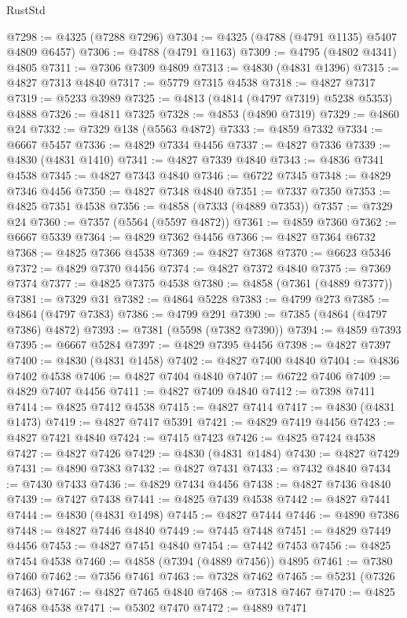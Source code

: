 \begin{lexlean}{RustStd}
\begin{coremodule}
@7298 := @4325 (@7288 @7296)
@7304 := @4325 (@4788 (@4791 @1135) @5407 @4809 @6457)
@7306 := @4788 (@4791 @1163)
@7309 := @4795 (@4802 @4341) @4805
@7311 := @7306 @7309 @4809
@7313 := @4830 (@4831 @1396)
@7315 := @4827 @7313 @4840
@7317 := @5779 @7315 @4538
@7318 := @4827 @7317
@7319 := @5233 @3989
@7325 := @4813 (@4814 (@4797 @7319) @5238 @5353) @4888
@7326 := @4811 @7325
@7328 := @4853 (@4890 @7319)
@7329 := @4860 @24
@7332 := @7329 @138 (@5563 @4872)
@7333 := @4859 @7332
@7334 := @6667 @5457
@7336 := @4829 @7334 @4456
@7337 := @4827 @7336
@7339 := @4830 (@4831 @1410)
@7341 := @4827 @7339 @4840
@7343 := @4836 @7341 @4538
@7345 := @4827 @7343 @4840
@7346 := @6722 @7345
@7348 := @4829 @7346 @4456
@7350 := @4827 @7348 @4840
@7351 := @7337 @7350
@7353 := @4825 @7351 @4538
@7356 := @4858 (@7333 (@4889 @7353))
@7357 := @7329 @24
@7360 := @7357 (@5564 (@5597 @4872))
@7361 := @4859 @7360
@7362 := @6667 @5339
@7364 := @4829 @7362 @4456
@7366 := @4827 @7364 @6732
@7368 := @4825 @7366 @4538
@7369 := @4827 @7368
@7370 := @6623 @5346
@7372 := @4829 @7370 @4456
@7374 := @4827 @7372 @4840
@7375 := @7369 @7374
@7377 := @4825 @7375 @4538
@7380 := @4858 (@7361 (@4889 @7377))
@7381 := @7329 @31
@7382 := @4864 @5228
@7383 := @4799 @273
@7385 := @4864 (@4797 @7383)
@7386 := @4799 @291
@7390 := @7385 (@4864 (@4797 @7386) @4872)
@7393 := @7381 (@5598 (@7382 @7390))
@7394 := @4859 @7393
@7395 := @6667 @5284
@7397 := @4829 @7395 @4456
@7398 := @4827 @7397
@7400 := @4830 (@4831 @1458)
@7402 := @4827 @7400 @4840
@7404 := @4836 @7402 @4538
@7406 := @4827 @7404 @4840
@7407 := @6722 @7406
@7409 := @4829 @7407 @4456
@7411 := @4827 @7409 @4840
@7412 := @7398 @7411
@7414 := @4825 @7412 @4538
@7415 := @4827 @7414
@7417 := @4830 (@4831 @1473)
@7419 := @4827 @7417 @5391
@7421 := @4829 @7419 @4456
@7423 := @4827 @7421 @4840
@7424 := @7415 @7423
@7426 := @4825 @7424 @4538
@7427 := @4827 @7426
@7429 := @4830 (@4831 @1484)
@7430 := @4827 @7429
@7431 := @4890 @7383
@7432 := @4827 @7431
@7433 := @7432 @4840
@7434 := @7430 @7433
@7436 := @4829 @7434 @4456
@7438 := @4827 @7436 @4840
@7439 := @7427 @7438
@7441 := @4825 @7439 @4538
@7442 := @4827 @7441
@7444 := @4830 (@4831 @1498)
@7445 := @4827 @7444
@7446 := @4890 @7386
@7448 := @4827 @7446 @4840
@7449 := @7445 @7448
@7451 := @4829 @7449 @4456
@7453 := @4827 @7451 @4840
@7454 := @7442 @7453
@7456 := @4825 @7454 @4538
@7460 := @4858 (@7394 (@4889 @7456)) @4895
@7461 := @7380 @7460
@7462 := @7356 @7461
@7463 := @7328 @7462
@7465 := @5231 (@7326 @7463)
@7467 := @4827 @7465 @4840
@7468 := @7318 @7467
@7470 := @4825 @7468 @4538
@7471 := @5302 @7470
@7472 := @4889 @7471

\end{coremodule}
\end{lexlean}
